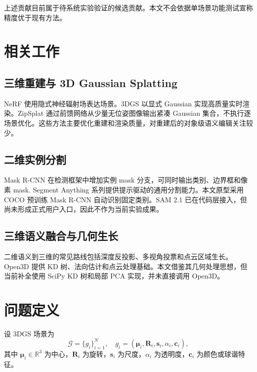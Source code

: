 \documentclass[10pt,twocolumn]{ctexart}
\begin{document}
上述贡献目前属于待系统实验验证的候选贡献。本文不会依据单场景功能测试宣称精度优于现有方法。

\section{相关工作}

\subsection{三维重建与 3D Gaussian Splatting}

NeRF 使用隐式神经辐射场表达场景\citep{mildenhall2020nerf}。3DGS 以显式 Gaussian 实现高质量实时渲染\citep{kerbl2023gaussian}。ZipSplat 通过前馈网络从少量无位姿图像输出紧凑 Gaussian 集合，不执行逐场景优化\citep{veicht2026zipsplat}。这些方法主要优化重建和渲染质量，对重建后的对象级语义编辑关注较少。

\subsection{二维实例分割}

Mask R-CNN 在检测框架中增加实例 mask 分支，可同时输出类别、边界框和像素 mask\citep{he2017mask}. Segment Anything 系列提供提示驱动的通用分割能力\citep{ravi2024sam2}。本文原型采用 COCO 预训练 Mask R-CNN 自动识别固定类别。SAM 2.1 已在代码层接入，但尚未形成正式用户入口，因此不作为当前实验成果。

\subsection{三维语义融合与几何生长}

二维语义到三维的常见路线包括深度反投影、多视角投票和点云区域生长。Open3D 提供 KD 树、法向估计和点云处理基础\citep{zhou2018open3d}。本文借鉴其几何处理思想，但当前补全使用 SciPy KD 树和局部 PCA 实现，并未直接调用 Open3D。

\section{问题定义}

设 3DGS 场景为
\begin{equation}
\mathcal{G}=\{g_i\}_{i=1}^{N},\quad
g_i=(\bm{\mu}_i,\mathbf{R}_i,\mathbf{s}_i,\alpha_i,\mathbf{c}_i),
\end{equation}
其中 $\bm{\mu}_i\in\mathbb{R}^3$ 为中心，$\mathbf{R}_i$ 为旋转，$\mathbf{s}_i$ 为尺度，$\alpha_i$ 为透明度，$\mathbf{c}_i$ 为颜色或球谐特征。
\end{document}
